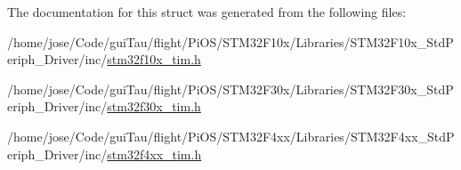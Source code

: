 The documentation for this struct was generated from the following files\-:\begin{DoxyCompactItemize}
\item 
/home/jose/\-Code/gui\-Tau/flight/\-Pi\-O\-S/\-S\-T\-M32\-F10x/\-Libraries/\-S\-T\-M32\-F10x\-\_\-\-Std\-Periph\-\_\-\-Driver/inc/\hyperlink{stm32f10x__tim_8h}{stm32f10x\-\_\-tim.\-h}\item 
/home/jose/\-Code/gui\-Tau/flight/\-Pi\-O\-S/\-S\-T\-M32\-F30x/\-Libraries/\-S\-T\-M32\-F30x\-\_\-\-Std\-Periph\-\_\-\-Driver/inc/\hyperlink{stm32f30x__tim_8h}{stm32f30x\-\_\-tim.\-h}\item 
/home/jose/\-Code/gui\-Tau/flight/\-Pi\-O\-S/\-S\-T\-M32\-F4xx/\-Libraries/\-S\-T\-M32\-F4xx\-\_\-\-Std\-Periph\-\_\-\-Driver/inc/\hyperlink{stm32f4xx__tim_8h}{stm32f4xx\-\_\-tim.\-h}\end{DoxyCompactItemize}
